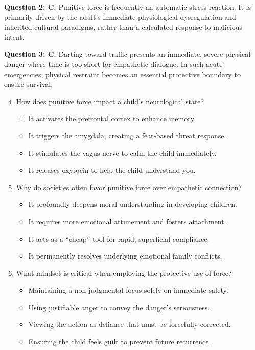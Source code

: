 \begin{practiceexercise}
\textbf{Question 2: C.} Punitive force is frequently an automatic stress reaction.
It is primarily driven by the adult's immediate physiological dysregulation and inherited cultural paradigms, rather than a calculated response to malicious intent.
\vspace{\fill}

\textbf{Question 3: C.} Darting toward traffic presents an immediate, severe physical danger where time is too short for empathetic dialogue.
In such acute emergencies, physical restraint becomes an essential protective boundary to ensure survival.
\vspace{\fill}
\newpage

\begin{enumerate}
  \setcounter{enumi}{3}
  \item How does punitive force impact a child's neurological state?
    \begin{itemize}
      \item[A)] It activates the prefrontal cortex to enhance memory.
      \item[B)] It triggers the amygdala, creating a fear-based threat response.
      \item[C)] It stimulates the vagus nerve to calm the child immediately.
      \item[D)] It releases oxytocin to help the child understand you.
    \end{itemize}
  \vspace{\fill}
  \item Why do societies often favor punitive force over empathetic connection?
    \begin{itemize}
      \item[A)] It profoundly deepens moral understanding in developing children.
      \item[B)] It requires more emotional attunement and fosters attachment.
      \item[C)] It acts as a ``cheap'' tool for rapid, superficial compliance.
      \item[D)] It permanently resolves underlying emotional family conflicts.
    \end{itemize}
  \vspace{\fill}
  \item What mindset is critical when employing the protective use of force?
    \begin{itemize}
      \item[A)] Maintaining a non-judgmental focus solely on immediate safety.
      \item[B)] Using justifiable anger to convey the danger's seriousness.
      \item[C)] Viewing the action as defiance that must be forcefully corrected.
      \item[D)] Ensuring the child feels guilt to prevent future recurrence.
    \end{itemize}
\end{enumerate}
\vspace{\fill}


\end{practiceexercise}
